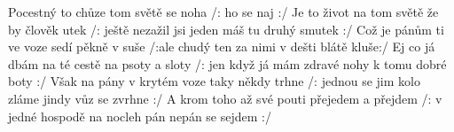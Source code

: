 \begin{TEXT}{Pocestný}
\SLOKA {} to chůze  tom světě  se noha  \NL
/:    ho  se naj  :/ 
\SLOKA Je to život na tom světě že by člověk utek \NL
/: ještě nezažil jsi jeden máš tu druhý smutek :/ 
\SLOKA Což je pánům ti ve voze sedí pěkně v suše \NL
/:ale chudý ten za nimi v dešti blátě kluše:/ 
\SLOKA Ej co já dbám na té cestě na psoty a sloty \NL
/: jen když já mám zdravé nohy k tomu dobré boty :/ 
\SLOKA Však na pány v krytém voze taky někdy trhne \NL
/: jednou se jim kolo zláme jindy vůz se zvrhne :/ 
\SLOKA A krom toho až své pouti přejedem a přejdem \NL
/: v jedné hospodě na nocleh pán nepán se sejdem :/ \NL
\end{TEXT}
